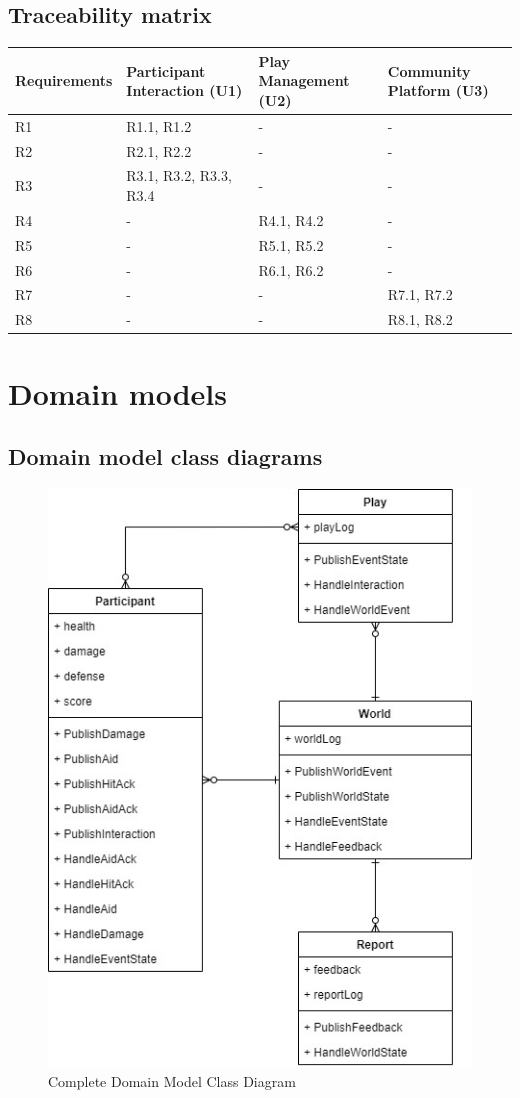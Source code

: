 \section{Traceability matrix}
\begin{tabular}{ |p{2cm}||p{4.5cm}|p{4cm}|p{4.5cm}|  }
 \hline
 Requirements & Participant Interaction (U1) & Play Management (U2) & Community Platform (U3) \\
 \hline
 \centering R1 & R1.1, R1.2 & - & - \\
 \centering R2 & R2.1, R2.2 & - & - \\
 \centering R3 & R3.1, R3.2, R3.3, R3.4 & - & - \\
 \centering R4 & - & R4.1, R4.2 & - \\
 \centering R5 & - & R5.1, R5.2 & - \\
 \centering R6 & - & R6.1, R6.2 & - \\
 \centering R7 & - & - & R7.1, R7.2\\
 \centering R8 & - & - & R8.1, R8.2\\
 \hline
\end{tabular}


\chapter{Domain models}
\label{Domain models}
\section{Domain model class diagrams}

\begin{figure}[h!]
\centering
\includegraphics[scale=0.5]{images/CompleteDomainModelClassDiagram.jpg}
\caption{Complete Domain Model Class Diagram}
\label{fig:CompleteDomainModelClassDiagram}
\end{figure}

